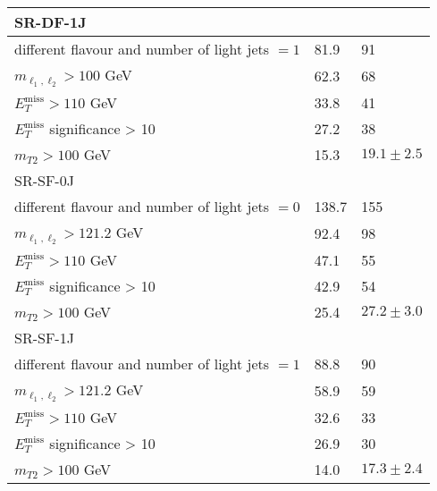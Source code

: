\documentclass[10pt,fleqn]{article}
\begin{document}
\begin{enumerate}
\begin{table}[h!]
\begin{tabular}{l|p{1.5cm}|p{1.5cm}}
  SR-DF-1J  & &\\ \midrule
  different flavour and number of light jets $=1$                                 &  81.9    &   91\\
  $m_{\ell_1,\ell_2} > 100  $ GeV                                                 &  62.3    &   68\\
  $E_T^\mathrm{miss} > 110$ GeV                                                   &  33.8    &   41\\
  $E_T^\mathrm{miss}$ significance > 10                                           &  27.2    &   38\\
  $m_{T2} >  100$ GeV                                                             &  15.3    &   $19.1 \pm 2.5$\\ \midrule     
  SR-SF-0J  & &\\ \midrule
  different flavour and number of light jets $=0$                                 & 138.7    &   155\\
  $m_{\ell_1,\ell_2} > 121.2  $ GeV                                               &  92.4    &   98\\
  $E_T^\mathrm{miss} > 110$ GeV                                                   &  47.1    &   55\\
  $E_T^\mathrm{miss}$ significance > 10                                           &  42.9    &   54\\
  $m_{T2} >  100$ GeV                                                             &  25.4    &   $27.2 \pm 3.0$ \\ \midrule     
  SR-SF-1J  & &\\ \midrule
  different flavour and number of light jets $=1$                                 & 88.8     &   90\\
  $m_{\ell_1,\ell_2} > 121.2  $ GeV                                               & 58.9     &   59\\
  $E_T^\mathrm{miss} > 110$ GeV                                                   & 32.6     &   33\\
  $E_T^\mathrm{miss}$ significance > 10                                           & 26.9     &   30\\
  $m_{T2} >  100$ GeV                                                             & 14.0     &   $17.3 \pm 2.4$\\ \bottomrule
 \end{tabular}
\end{table} 
 
\newpage 
 

\end{enumerate}
\end{document}
